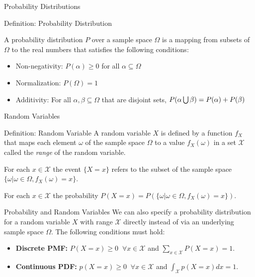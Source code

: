 \documentclass[serif,xcolor=pdftex,dvipsnames,table,hyperref={bookmarks=false,breaklinks}]{beamer}
\begin{document}
\begin{frame}[t]{Probability Distributions}

\begin{block}{Definition: Probability Distribution}

  A probability distribution $P$ over a sample space $\Omega$ is a mapping from subsets of $\Omega$ to the real numbers that satisfies the following conditions:

  \pause
  \begin{itemize}[<+->]
    \item Non-negativity: $P(\alpha) \geq 0$ for all $\alpha \subseteq \Omega$
    \item Normalization: $P(\Omega) =1$
    \item Additivity: For all $\alpha, \beta \subseteq  \Omega$ that are disjoint sets, $P(\alpha \operatorname*{\bigcup} \beta) = P(\alpha) + P(\beta)$
  \end{itemize}

\end{block}
\end{frame}

\begin{frame}[t]{Random Variables} 
\begin{block}{Definition: Random Variable}
  A random variable $X$ is defined by a function $f_X$ that maps each element $\omega$ of the sample space $\Omega$ to a value $f_X(\omega)$ in a set $\mathcal{X}$ called the \emph{range} of the random variable.
  \medskip

  \pause
  For each $x\in \mathcal{X}$ the event $\{X=x\}$ refers to the subset of the sample space $\{\omega | \omega\in \Omega, f_X(\omega)=x\}$.
  \medskip
  
  \pause
  For each $x\in \mathcal{X}$ the probability $P(X=x) = P(\{\omega | \omega\in \Omega, f_X(\omega)=x\})$.
  
\end{block}
\end{frame}

\begin{frame}[t]{Probability and Random Variables} 
We can also specify a probability distribution for a random variable $X$ with range $\mathcal{X}$ directly instead of via an underlying sample space $\Omega$. The following conditions must hold:

\begin{itemize}[<+->]
\item \textbf{Discrete PMF:} $P(X=x)\geq 0 \;\;\forall x \in \mathcal X$ 
  and $\sum_{x\in\mathcal{X}}P(X=x)=1$.
\item \textbf{Continuous PDF:} $p(X=x)\geq 0 \;\; \forall x \in \mathcal X$ 
  and $\int_{\mathcal{X}}p(X=x)dx =1$.
\end{itemize}

\end{frame}
\end{document}
